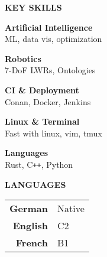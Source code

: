 \documentclass[a4paper, 10pt]{article}
\begin{document}
\begin{tcbraster}[raster columns=7]
\begin{tcolorbox}[left=4pt, right=4pt, top=4pt, height=1.0\textheight, colback=sidebar, boxrule=0.5pt, arc=8pt, frame empty, raster multicolumn=2, nobeforeafter]
    \vspace{4mm}
    \begin{center}
        {\textbf{KEY SKILLS}} \\
    \end{center}

    \begin{keyskills}
        \item \textbf{Artificial Intelligence}\\ ML, data vis, optimization
        \item \textbf{Robotics}\\ 7-DoF LWRs, Ontologies
        \item \textbf{CI \& Deployment}\\ Conan, Docker, Jenkins
        \item \textbf{Linux \& Terminal}\\ Fast with linux, vim, tmux
        \item \textbf{Languages}\\ Rust, C{}\verb|++|, Python
    \end{keyskills}

    \vspace{8mm}
    \begin{center}
        {\textbf{LANGUAGES}} \\
    \end{center}
    \begin{center}
        \begin{tabular}[c]{rl}
            \textbf{German} & Native \\
            \textbf{English} & C2 \\
            \textbf{French} & B1 \\
        \end{tabular}
    \end{center}


\end{tcolorbox}
\begin{tcolorbox}[left=1cm, height=1.0\textheight, colback=white, raster multicolumn=5, boxrule=0pt, frame empty, nobeforeafter]

\end{tcolorbox}
\end{tcbraster}
\end{document}

